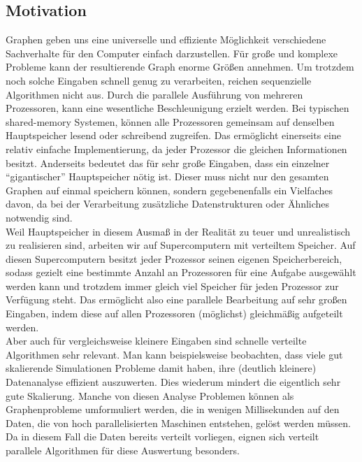 \subsection{Motivation}
Graphen geben uns eine universelle und effiziente Möglichkeit verschiedene Sachverhalte für den Computer einfach darzustellen. Für große und komplexe Probleme kann der resultierende Graph enorme Größen annehmen. Um trotzdem noch solche Eingaben schnell genug zu verarbeiten, reichen sequenzielle Algorithmen nicht aus. Durch die parallele Ausführung von mehreren Prozessoren, kann eine wesentliche Beschleunigung erzielt werden. Bei typischen shared-memory Systemen, können alle Prozessoren gemeinsam auf denselben Hauptspeicher lesend oder schreibend zugreifen. Das ermöglicht einerseits eine relativ einfache Implementierung, da jeder Prozessor die gleichen Informationen besitzt. Anderseits bedeutet das für sehr große Eingaben, dass ein einzelner \enquote{gigantischer} Hauptspeicher nötig ist. Dieser muss nicht nur den gesamten Graphen auf einmal speichern können, sondern gegebenenfalls ein Vielfaches davon, da bei der Verarbeitung zusätzliche Datenstrukturen oder Ähnliches notwendig sind. \\
Weil Hauptspeicher in diesem Ausmaß in der Realität zu teuer und unrealistisch zu realisieren sind, arbeiten wir auf Supercomputern mit verteiltem Speicher. Auf diesen Supercomputern besitzt jeder Prozessor seinen eigenen Speicherbereich, sodass gezielt eine bestimmte Anzahl an Prozessoren für eine Aufgabe ausgewählt werden kann und trotzdem immer gleich viel Speicher für jeden Prozessor zur Verfügung steht.
Das ermöglicht also eine parallele Bearbeitung auf sehr großen Eingaben, indem diese auf allen Prozessoren (möglichst) gleichmäßig aufgeteilt werden. \\
Aber auch für vergleichsweise kleinere Eingaben sind schnelle verteilte Algorithmen sehr relevant. Man kann beispielsweise beobachten, dass viele gut skalierende Simulationen Probleme damit haben, ihre (deutlich kleinere) Datenanalyse effizient auszuwerten. Dies wiederum mindert die eigentlich sehr gute Skalierung.
Manche von diesen Analyse Problemen können als Graphenprobleme umformuliert werden, die in wenigen Millisekunden auf den Daten, die von hoch parallelisierten Maschinen entstehen, gelöst werden müssen. Da in diesem Fall die Daten bereits verteilt vorliegen, eignen sich verteilt parallele Algorithmen für diese Auswertung besonders.


